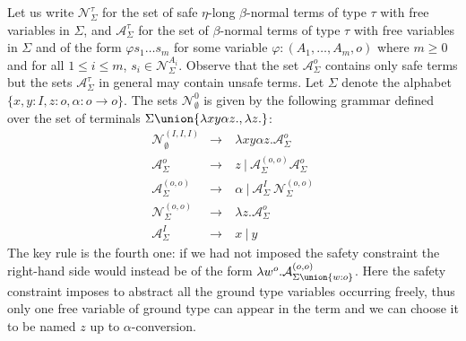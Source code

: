 Let us write $\mathcal{N}^\tau_\Sigma$ for the set of safe
$\eta$-long $\beta$-normal terms of type $\tau$ with free variables
in $\Sigma$, and $\mathcal{A}^\tau_\Sigma$ for the set of
$\beta$-normal terms of type $\tau$ with free variables in $\Sigma$
and of the form $\varphi s_1 \ldots s_m$ for some variable
$\varphi:(A_1,\ldots,A_m,o)$ where $m\geq0$ and for all $1\leq i
\leq m$, $s_i \in \mathcal{N}^{A_i}_\Sigma$. Observe that the set
$\mathcal{A}^o_\Sigma$ contains only safe terms but the sets
$\mathcal{A}^\tau_\Sigma$ in general may contain unsafe terms. Let
$\Sigma$ denote the alphabet $\{ x, y : I, z :o, \alpha :
o\rightarrow o \}$. The sets $\mathcal{N}^0_\emptyset$ is given by
the following grammar defined over the set of terminals $\Sigma
\union \{\lambda x y \alpha z. , \lambda z. \}$:
\begin{eqnarray*}
\mathcal{N}^{(I,I,I)}_\emptyset &\rightarrow& \ \lambda x y \alpha z . \mathcal{A}^o_\Sigma \\
\mathcal{A}^o_\Sigma &\rightarrow&\ z \ | \ \mathcal{A}^{(o,o)}_\Sigma \mathcal{A}^o_\Sigma \\
\mathcal{A}^{(o,o)}_\Sigma &\rightarrow&\ \alpha \ |\ \mathcal{A}^I_\Sigma ~\mathcal{N}^{(o,o)}_\Sigma \\
\mathcal{N}^{(o,o)}_\Sigma &\rightarrow& \ \lambda z . \mathcal{A}^{o}_\Sigma \\
\mathcal{A}^I_\Sigma &\rightarrow&\ x \ |\ y
\end{eqnarray*}
The key rule is the fourth one: if we had not imposed the safety
constraint the right-hand side would instead be of the form $\lambda
w^o . \mathcal{A}^{(o,o)}_{\Sigma\union\{w:o\}}$. Here the safety
constraint imposes to abstract all the ground type variables
occurring freely, thus only one free variable of ground type can
appear in the term and we can choose it to be named $z$ up to
$\alpha$-conversion.

